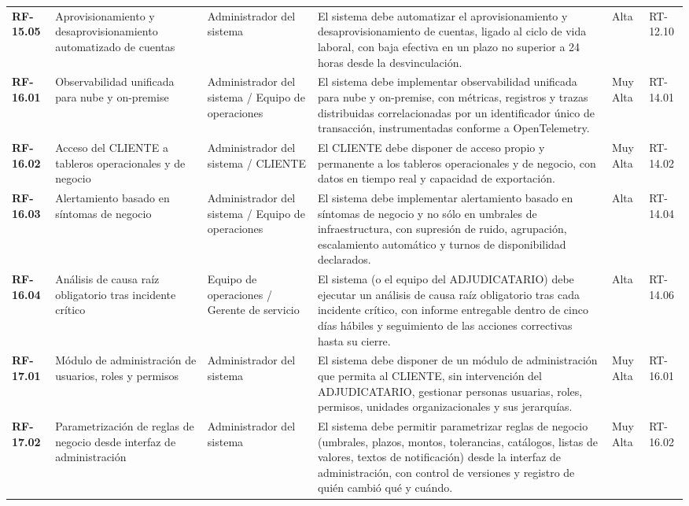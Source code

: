 \begin{longtable}{p{1.7cm} p{2.3cm} p{1.9cm} p{5.0cm} p{1.1cm} p{1.9cm}}
\textbf{RF-15.05} & Aprovisionamiento y desaprovisionamiento automatizado de cuentas & Administrador del sistema & El sistema debe automatizar el aprovisionamiento y desaprovisionamiento de cuentas, ligado al ciclo de vida laboral, con baja efectiva en un plazo no superior a 24 horas desde la desvinculación. & Alta & RT-12.10 \\
\textbf{RF-16.01} & Observabilidad unificada para nube y on-premise & Administrador del sistema / Equipo de operaciones & El sistema debe implementar observabilidad unificada para nube y on-premise, con métricas, registros y trazas distribuidas correlacionadas por un identificador único de transacción, instrumentadas conforme a OpenTelemetry. & Muy Alta & RT-14.01 \\
\textbf{RF-16.02} & Acceso del CLIENTE a tableros operacionales y de negocio & Administrador del sistema / CLIENTE & El CLIENTE debe disponer de acceso propio y permanente a los tableros operacionales y de negocio, con datos en tiempo real y capacidad de exportación. & Muy Alta & RT-14.02 \\
\textbf{RF-16.03} & Alertamiento basado en síntomas de negocio & Administrador del sistema / Equipo de operaciones & El sistema debe implementar alertamiento basado en síntomas de negocio y no sólo en umbrales de infraestructura, con supresión de ruido, agrupación, escalamiento automático y turnos de disponibilidad declarados. & Alta & RT-14.04 \\
\textbf{RF-16.04} & Análisis de causa raíz obligatorio tras incidente crítico & Equipo de operaciones / Gerente de servicio & El sistema (o el equipo del ADJUDICATARIO) debe ejecutar un análisis de causa raíz obligatorio tras cada incidente crítico, con informe entregable dentro de cinco días hábiles y seguimiento de las acciones correctivas hasta su cierre. & Alta & RT-14.06 \\
\textbf{RF-17.01} & Módulo de administración de usuarios, roles y permisos & Administrador del sistema & El sistema debe disponer de un módulo de administración que permita al CLIENTE, sin intervención del ADJUDICATARIO, gestionar personas usuarias, roles, permisos, unidades organizacionales y sus jerarquías. & Muy Alta & RT-16.01 \\
\textbf{RF-17.02} & Parametrización de reglas de negocio desde interfaz de administración & Administrador del sistema & El sistema debe permitir parametrizar reglas de negocio (umbrales, plazos, montos, tolerancias, catálogos, listas de valores, textos de notificación) desde la interfaz de administración, con control de versiones y registro de quién cambió qué y cuándo. & Muy Alta & RT-16.02 \\

\end{longtable}
